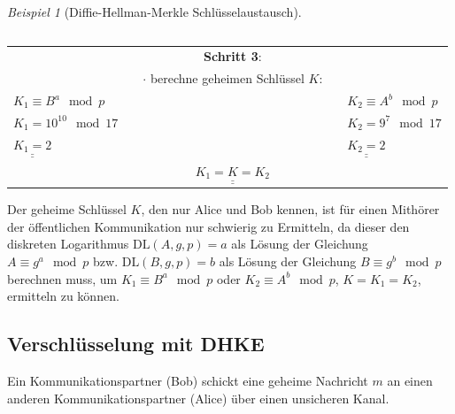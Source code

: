 \documentclass[
  a4paper,
  11pt,
]{scrartcl}
\theoremstyle{plain}
\theoremstyle{definition}
\theoremstyle{remark}
\newtheorem{beispiel}{Beispiel}
\def\doubleunderline#1{\underline{\underline{#1}}} %
\begin{document}
\begin{beispiel}[Diffie-Hellman-Merkle Schlüsselaustausch]
\begin{center}
\begin{tabularx}{\textwidth}{lXcXl}
	    \end{tabularx}
	    \begin{tabularx}{\textwidth}{lXcXl}
	    	& & \textbf{Schritt 3}: & & \\
	    	& & $\cdot$ berechne geheimen Schlüssel $K$: & & \\
	    	$K_1 \equiv B^a \mod p$ & & & & $K_2 \equiv A^b \mod p$\\
	    	$K_1 = 10^{10} \mod 17$ & & & & $K_2 = 9^7 \mod 17$\\
	    	$\doubleunderline{K_1 = 2}$ & & & & $\doubleunderline{K_2 = 2}$\\
	    	& & $\doubleunderline{K_1 = K = K_2}$ & &
	    \end{tabularx}
	\end{center}
Der geheime Schlüssel $K$, den nur Alice und Bob kennen, ist für einen Mithörer der öffentlichen Kommunikation nur schwierig zu Ermitteln, da dieser den diskreten Logarithmus $\text{DL}(A,g,p) = a$ als Lösung der Gleichung $A \equiv g^a \mod p$ bzw. $\text{DL}(B,g,p) = b$ als Lösung der Gleichung $B \equiv g^b \mod p$ berechnen muss, um $K_1 \equiv B^a \mod p$ oder $K_2 \equiv A^b \mod p$, $K = K_1 = K_2$, ermitteln zu können.\\
\end{beispiel}

\subsection{Verschlüsselung mit DHKE}
\label{sub:enc_with_dhke}
Ein Kommunikationspartner (Bob) schickt eine geheime Nachricht $m$ an einen anderen Kommunikationspartner (Alice) über einen unsicheren Kanal.
\end{document}
